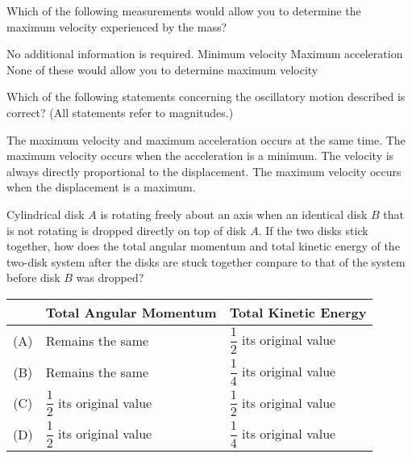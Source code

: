 \documentclass[12pt]{exam}
\newcommand{\pic}[2]{
  \begin{center}
    \texttt{[image: \#2]}
  \end{center}
}
\begin{document}
\begin{questions}

  \question Which of the following measurements would allow you to determine the
  maximum velocity experienced by the mass?
  \label{mass1}
  \begin{choices}
    \choice No additional information is required.
    \choice Minimum velocity
    \choice Maximum acceleration
    \choice None of these would allow you to determine maximum velocity
  \end{choices}
    
  \question Which of the following statements concerning the oscillatory motion
  described is correct? (All statements refer to magnitudes.)
  \label{mass2}
  \begin{choices}
    \choice The maximum velocity and maximum acceleration occurs at the same
    time.
    \choice The maximum velocity occurs when the acceleration is a minimum.
    \choice The velocity is always directly proportional to the displacement.
    \choice The maximum velocity occurs when the displacement is a maximum.
  \end{choices}

  \uplevel{
    \pic{.25}{disks}
  }
  \question Cylindrical disk $A$ is rotating freely about an axis when an
  identical disk $B$ that is not rotating is dropped directly on top of disk
  $A$. If the two disks stick together, how does the total angular momentum
  and total kinetic energy of the two-disk system after the disks are stuck
  together compare to that of the system before disk $B$ was dropped?
  
  \begin{tabular}{cll}
    & Total Angular Momentum & Total Kinetic Energy\\
    \hline
    (A) & Remains the same & $\dfrac12$ its original value\\
    (B) & Remains the same & $\dfrac14$ its original value\\
    (C) & $\dfrac12$ its original value & $\dfrac12$ its original value\\
    (D) & $\dfrac12$ its original value & $\dfrac14$ its original value
  \end{tabular}
\end{questions}

%  
%
%
\end{document}

